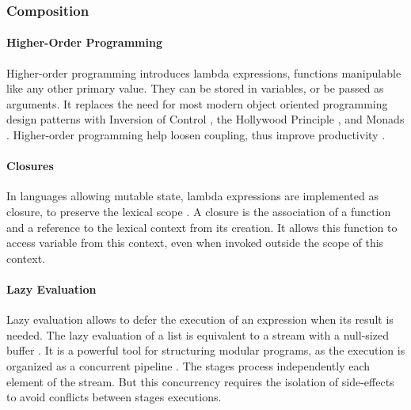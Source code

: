\subsubsection{Composition} \label{chapter3:definitions:productivity:composition}

\paragraph{Higher-Order Programming}
Higher-order programming introduces lambda expressions, functions manipulable like any other primary value.
They can be stored in variables, or be passed as arguments.
It replaces the need for most modern object oriented programming design patterns  with Inversion of Control \cite{Johnson}, the Hollywood Principle \cite{Sweet1985}, and Monads \cite{Wadler1992}.
Higher-order programming help loosen coupling, thus improve productivity \cite{Haynes1984}.

\paragraph{Closures}
In languages allowing mutable state, lambda expressions are implemented as closure, to preserve the lexical scope \cite{Sussman1998}.
A closure is the association of a function and a reference to the lexical context from its creation.
It allows this function to access variable from this context, even when invoked outside the scope of this context.

\paragraph{Lazy Evaluation}
Lazy evaluation allows to defer the execution of an expression when its result is needed.
The lazy evaluation of a list is equivalent to a stream with a null-sized buffer \cite{VanRoy2003}. %
It is a powerful tool for structuring modular programs, as the execution is organized as a concurrent pipeline \cite{Sussman1983}.
The stages process independently each element of the stream.
But this concurrency requires the isolation of side-effects to avoid conflicts between stages executions.

